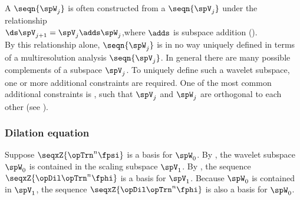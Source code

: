 
A  $\seqn{\spW_j}$ is often constructed from a  
$\seqn{\spV_j}$ under the relationship
\\\indentx$\ds\spV_{j+1} = \spV_j \adds \spW_j$,\qquad where $\adds$ is subspace addition ().\\
By this relationship alone, $\seqn{\spW_j}$ is in no way uniquely defined 
in terms of a multiresolution analysis $\seqn{\spV_j}$.
In general there are many possible complements of a subspace $\spV_j$.
To uniquely define such a wavelet subspace, one or more additional constraints are required.
One of the most common additional constraints is , such that
$\spV_j$ and $\spW_j$ are orthogonal to each other (see ).




\subsubsection{Dilation equation}
Suppose $\seqxZ{\opTrn^n\fpsi}$ is a basis for $\spW_0$.
By , the wavelet subspace $\spW_0$ is contained in the 
scaling subspace $\spV_1$.
By , the sequence $\seqxZ{\opDil\opTrn^n\fphi}$ is a basis for $\spV_1$.
Because $\spW_0$ is contained in $\spV_1$,
the sequence $\seqxZ{\opDil\opTrn^n\fphi}$ is also a basis for $\spW_0$.

